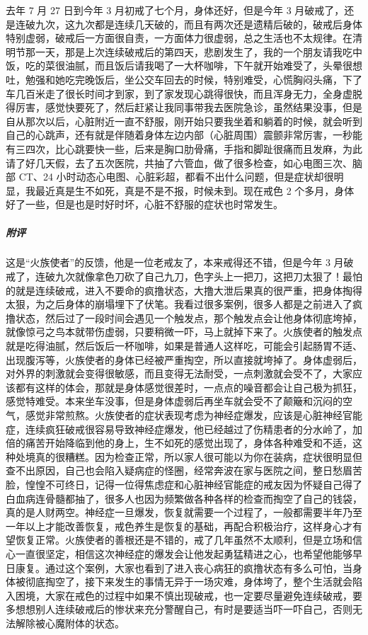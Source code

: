 \begin{case}
    去年 7 月 27 日到今年 3 月初戒了七个月，身体还好，但是今年 3 月破戒了，还是连破九次，这九次都是连续几天破的，而且有两次还是遗精后破的，破戒后身体特别虚弱，破戒后一方面很自责，一方面体力很虚弱，总之生活也不太规律。在清明节那一天，那是上次连续破戒后的第四天，悲剧发生了，我的一个朋友请我吃中饭，吃的菜很油腻，而且饭后请我喝了一大杯咖啡，下午就开始难受了，头晕很想吐，勉强和她吃完晚饭后，坐公交车回去的时候，特别难受，心慌胸闷头痛，下了车几百米走了很长时间才到家，到了家发现心跳得很快，而且浑身无力，全身虚脱得厉害，感觉快要死了，然后赶紧让我同事带我去医院急诊，虽然结果没事，但是自从那次以后，心脏附近一直不舒服，刚开始只要我坐着和躺着的时候，就会听到自己的心跳声，还有就是伴随着身体左边内部（心脏周围）震颤非常厉害，一秒能有三四次，比心跳要快一些，后来是胸口肋骨痛，手指和脚趾很痛而且发麻，为此请了好几天假，去了五次医院，共抽了六管血，做了很多检查，如心电图三次、脑部 CT、24 小时动态心电图、心脏彩超，都看不出什么问题，但是症状却很明显，我最近真是生不如死，真是不是不报，时候未到。现在戒色 2 个多月，身体好了一些，但是也是时好时坏，心脏不舒服的症状也时常发生。
    \subparagraph{附评} 这是“火族使者”的反馈，他是一位老戒友了，本来戒得还不错，但是今年 3 月破戒了，连破九次就像拿色刀砍了自己九刀，色字头上一把刀，这把刀太狠了！最怕的就是连续破戒，进入不要命的疯撸状态，大撸大泄后果真的很严重，把身体掏得太狠，为之后身体的崩塌埋下了伏笔。我看过很多案例，很多人都是之前进入了疯撸状态，然后过了一段时间会遇见一个触发点，那个触发点会让他身体彻底垮掉，就像惊弓之鸟本就带伤虚弱，只要稍微一吓，马上就掉下来了。火族使者的触发点就是吃得油腻，然后饭后一杯咖啡，如果是普通人这样吃，可能会引起肠胃不适、出现腹泻等，火族使者的身体已经被严重掏空，所以直接就垮掉了。身体虚弱后，对外界的刺激就会变得很敏感，而且变得无法耐受，一点刺激就会受不了，大家应该都有这样的体会，那就是身体感觉很差时，一点点的噪音都会让自己极为抓狂，感觉特难受。本来坐车没事，但是身体虚弱后再坐车就会受不了颠簸和沉闷的空气，感觉非常煎熬。火族使者的症状表现考虑为神经症爆发，应该是心脏神经官能症，连续疯狂破戒很容易导致神经症爆发，他已经越过了伤精患者的分水岭了，加倍的痛苦开始降临到他的身上，生不如死的感觉出现了，身体各种难受和不适，这种处境真的很糟糕。因为检查正常，所以家人很可能以为你在装病，症状很明显但查不出原因，自己也会陷入疑病症的怪圈，经常奔波在家与医院之间，整日愁眉苦脸，惶惶不可终日，记得一位得焦虑症和心脏神经官能症的戒友因为怀疑自己得了白血病连骨髓都抽了，很多人也因为频繁做各种各样的检查而掏空了自己的钱袋，真的是人财两空。神经症一旦爆发，恢复就需要一个过程了，一般都需要半年乃至一年以上才能改善恢复，戒色养生是恢复的基础，再配合积极治疗，这样身心才有望恢复正常。火族使者的善根还是不错的，戒了几年虽然不太顺利，但是立场和信心一直很坚定，相信这次神经症的爆发会让他发起勇猛精进之心，也希望他能够早日康复。通过这个案例，大家也看到了进入丧心病狂的疯撸状态有多么可怕，当身体被彻底掏空了，接下来发生的事情无异于一场灾难，身体垮了，整个生活就会陷入困境，大家在戒色的过程中如果不慎出现破戒，也一定要尽量避免连续破戒，要多想想别人连续破戒后的惨状来充分警醒自己，有时是要适当吓一吓自己，否则无法解除被心魔附体的状态。
\end{case}

